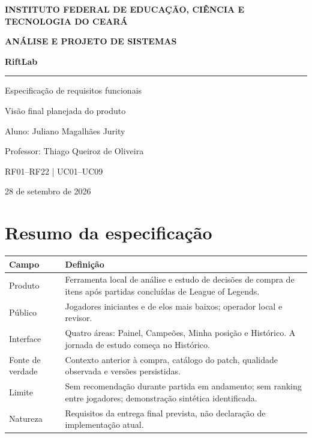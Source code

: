 \documentclass[12pt,a4paper]{article}
\begin{document}
\begin{titlepage}
  \setlength{\parindent}{0pt}\raggedright
  {\normalsize\bfseries INSTITUTO FEDERAL DE EDUCAÇÃO, CIÊNCIA E\\ TECNOLOGIA DO CEARÁ\par}
  \vspace*{2.0cm}
  {\Large\bfseries ANÁLISE E PROJETO DE SISTEMAS\par}
  \vspace{1.7cm}
  {\Huge\bfseries RiftLab\par}
  \vspace{0.4cm}
  {\rule{9cm}{1pt}\par}
  \vspace{0.7cm}
  {\LARGE Especificação de requisitos funcionais\par}
  \vspace{0.5cm}
  {\large Visão final planejada do produto\par}
  \vspace{1.6cm}
  {\large Aluno: Juliano Magalhães Jurity\par}
  \vspace{0.3cm}
  {\large Professor: Thiago Queiroz de Oliveira\par}
  \vfill
  {\large RF01--RF22 \quad | \quad UC01--UC09\par}
  \vspace{0.3cm}
  {28 de setembro de 2026\par}
\end{titlepage}

\section*{Resumo da especificação}
\begin{center}
\begin{tabular}{@{}p{3.4cm}p{10.3cm}@{}}
\toprule
\bfseries Campo & \bfseries Definição \\
\midrule
Produto & Ferramenta local de análise e estudo de decisões de compra de itens após partidas concluídas de League of Legends. \\
Público & Jogadores iniciantes e de elos mais baixos; operador local e revisor. \\
Interface & Quatro áreas: Painel, Campeões, Minha posição e Histórico. A jornada de estudo começa no Histórico. \\
Fonte de verdade & Contexto anterior à compra, catálogo do patch, qualidade observada e versões persistidas. \\
Limite & Sem recomendação durante partida em andamento; sem ranking entre jogadores; demonstração sintética identificada. \\
Natureza & Requisitos da entrega final prevista, não declaração de implementação atual. \\
\bottomrule
\end{tabular}
\end{center}
\clearpage
\end{document}
